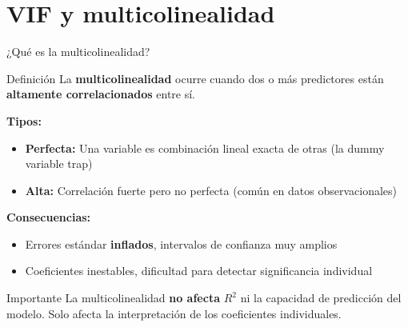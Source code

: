 \documentclass[aspectratio=169, 11pt]{beamer}
\begin{document}
\section{VIF y multicolinealidad}

\begin{frame}{¿Qué es la multicolinealidad?}
\begin{block}{Definición}
La \textbf{multicolinealidad} ocurre cuando dos o más predictores están \textbf{altamente correlacionados} entre sí.
\end{block}

\vspace{0.1cm}
\textbf{Tipos:}
\begin{itemize}
  \item \textbf{Perfecta:} Una variable es combinación lineal exacta de otras (la dummy variable trap)
  \item \textbf{Alta:} Correlación fuerte pero no perfecta (común en datos observacionales)
\end{itemize}

\vspace{0.1cm}
\textbf{Consecuencias:}
\begin{itemize}
  \item Errores estándar \textbf{inflados}, intervalos de confianza muy amplios
  \item Coeficientes inestables, dificultad para detectar significancia individual
\end{itemize}

\vspace{0.2cm}
\begin{alertblock}{Importante}
La multicolinealidad \textbf{no afecta} $R^2$ ni la capacidad de predicción del modelo. Solo afecta la interpretación de los coeficientes individuales.
\end{alertblock}
\end{frame}
\end{document}
